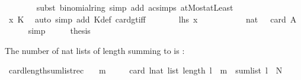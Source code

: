 \begin{isabellebody}
\ \ \ \ \ \ \isamarkupfalse%
\ {\isacharparenleft}{\kern0pt}subst\ binomial{\isacharunderscore}{\kern0pt}ring{\isacharparenright}{\kern0pt}\ {\isacharparenleft}{\kern0pt}simp\ add{\isacharcolon}{\kern0pt}\ ac{\isacharunderscore}{\kern0pt}simps\ atMost{\isacharunderscore}{\kern0pt}atLeast{}{\isacharparenright}{\kern0pt}\isanewline
\ \ \ \ \isamarkupfalse%
\ \isamarkupfalse%
\ {\isachardoublequoteopen}{\isasymdots}\ {\isacharequal}{\kern0pt}\ {}{\isachardoublequoteclose}\isanewline
\ \ \ \ \ \ \isamarkupfalse%
\ x\ K\ \isamarkupfalse%
\ {\isacharparenleft}{\kern0pt}auto\ simp\ add{\isacharcolon}{\kern0pt}\ K{\isacharunderscore}{\kern0pt}def\ card{\isacharunderscore}{\kern0pt}gt{\isacharunderscore}{\kern0pt}{}{\isacharunderscore}{\kern0pt}iff{\isacharparenright}{\kern0pt}\isanewline
\ \ \ \ \isamarkupfalse%
\ \isamarkupfalse%
\ {\isachardoublequoteopen}{\isacharquery}{\kern0pt}lhs\ x\ {\isacharequal}{\kern0pt}\ {}{\isachardoublequoteclose}\ \isacommand{{\isachardot}{\kern0pt}}\isamarkupfalse%
\isanewline
\ \ \isamarkupfalse%
\isanewline
\ \ \isamarkupfalse%
\ \isamarkupfalse%
\ {\isachardoublequoteopen}nat\ {\isasymdots}\ {\isacharequal}{\kern0pt}\ card\ {\isacharparenleft}{\kern0pt}{\isasymUnion}A{\isacharparenright}{\kern0pt}{\isachardoublequoteclose}\isanewline
\ \ \ \ \isamarkupfalse%
\ simp\isanewline
\ \ \isamarkupfalse%
\ \isamarkupfalse%
\ {\isacharquery}{\kern0pt}thesis\ \isacommand{{\isachardot}{\kern0pt}{\isachardot}{\kern0pt}}\isamarkupfalse%
\isanewline
{}\isamarkupfalse%
%
\endisatagproof
{\isafoldproof}%
%
\isadelimproof
%
\endisadelimproof
%
\begin{isamarkuptext}%
The number of nat lists of length  summing to  is :%
\end{isamarkuptext}\isamarkuptrue%
\isamarkupfalse%
\ card{\isacharunderscore}{\kern0pt}length{\isacharunderscore}{\kern0pt}sum{\isacharunderscore}{\kern0pt}list{\isacharunderscore}{\kern0pt}rec{\isacharcolon}{\kern0pt}\isanewline
\ \ \ {\isachardoublequoteopen}m\ {\isasymge}\ {}{\isachardoublequoteclose}\isanewline
\ \ \ {\isachardoublequoteopen}card\ {\isacharbraceleft}{\kern0pt}l{\isacharcolon}{\kern0pt}{\isacharcolon}{\kern0pt}nat\ list{\isachardot}{\kern0pt}\ length\ l\ {\isacharequal}{\kern0pt}\ m\ {\isasymand}\ sum{\isacharunderscore}{\kern0pt}list\ l\ {\isacharequal}{\kern0pt}\ N{\isacharbraceright}{\kern0pt}\ {\isacharequal}{\kern0pt}\isanewline

\end{isabellebody}
